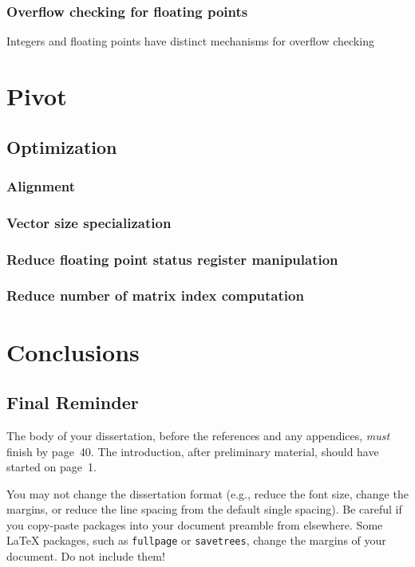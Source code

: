 \documentclass[logo,bsc,singlespacing,parskip]{infthesis}
\begin{document}
\subsection{Overflow checking for floating points}
Integers and floating points have distinct mechanisms for overflow checking

\chapter{Pivot}

\section{Optimization}
\subsection{Alignment}
\subsection{Vector size specialization}
\subsection{Reduce floating point status register manipulation}
\subsection{Reduce number of matrix index computation}
\label{sec:optmz-get-index}


\chapter{Conclusions}

\section{Final Reminder}

The body of your dissertation, before the references and any appendices,
\emph{must} finish by page~40. The introduction, after preliminary material,
should have started on page~1.

You may not change the dissertation format (e.g., reduce the font size, change
the margins, or reduce the line spacing from the default single spacing). Be
careful if you copy-paste packages into your document preamble from elsewhere.
Some \LaTeX{} packages, such as \texttt{fullpage} or \texttt{savetrees}, change
the margins of your document. Do not include them!
\end{document}
